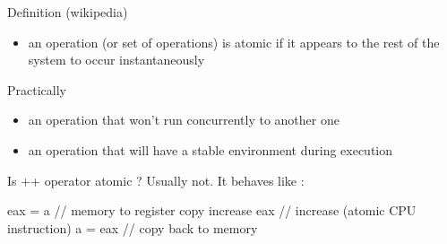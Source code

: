 \begin{frame}[fragile]
  \begin{exampleblock}{Definition (wikipedia)}
    \begin{itemize}
    \item an operation (or set of operations) is atomic if it appears to the rest of the system to occur instantaneously
    \end{itemize}
  \end{exampleblock}
  \begin{block}{Practically}
    \begin{itemize}
    \item an operation that won't run concurrently to another one
    \item an operation that will have a stable environment during execution
    \end{itemize}
  \end{block}
  \pause
  \begin{alertblock}{Is ++ operator atomic ?}
    \pause
    Usually not. It behaves like :
    \begin{cppcode*}{}
      eax = a       // memory to register copy
      increase eax  // increase (atomic CPU instruction)
      a = eax       // copy back to memory
    \end{cppcode*}
  \end{alertblock}
\end{frame}

